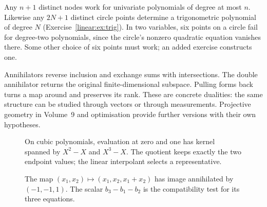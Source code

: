 Any $n+1$ distinct nodes work for univariate polynomials of degree at most $n$. Likewise any $2N+1$ distinct circle points determine a trigonometric polynomial of degree $N$ (Exercise~\ref{linear:ex:trig}). In two variables, six points on a circle fail for degree-two polynomials, since the circle's nonzero quadratic equation vanishes there. Some other choice of six points must work; an added exercise constructs one.

\begin{beauty}
Annihilators reverse inclusion and exchange sums with intersections. The double annihilator returns the original finite-dimensional subspace. Pulling forms back turns a map around and preserves its rank. These are concrete dualities: the same structure can be studied through vectors or through measurements. Projective geometry in Volume~9 and optimisation provide further versions with their own hypotheses.
\end{beauty}

\begin{figure}[ht]
\centering{}
\caption{On cubic polynomials, evaluation at zero and one has kernel spanned by $X^2-X$ and $X^3-X$. The quotient keeps exactly the two endpoint values; the linear interpolant selects a representative.}
\label{fig:v8appAeval}
\end{figure}
\begin{figure}[ht]
\centering{}
\caption{The map $(x_1,x_2)\mapsto(x_1,x_2,x_1+x_2)$ has image annihilated by $(-1,-1,1)$. The scalar $b_3-b_1-b_2$ is the compatibility test for its three equations.}
\label{fig:v8appAcert}
\end{figure}
